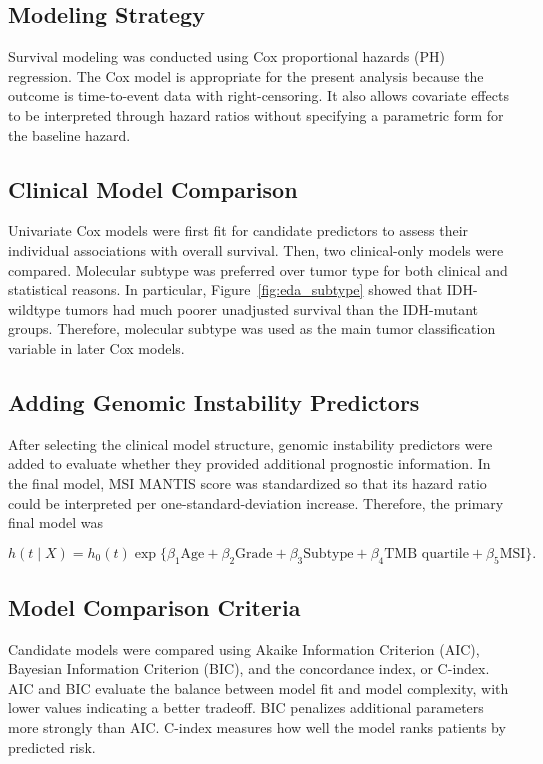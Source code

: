 \documentclass[paper=a4, fontsize=11pt]{scrartcl}
\numberwithin{equation}{section}		%
\numberwithin{figure}{section}			%
\numberwithin{table}{section}				%
\begin{document}
\subsection{Modeling Strategy}

Survival modeling was conducted using Cox proportional hazards (PH) regression. The Cox model is appropriate for the present analysis because the outcome is time-to-event data with right-censoring. It also allows covariate effects to be interpreted through hazard ratios without specifying a parametric form for the baseline hazard. 

\subsection{Clinical Model Comparison}

Univariate Cox models were first fit for candidate predictors to assess their individual associations with overall survival. Then, two clinical-only models were compared. Molecular subtype was preferred over tumor type for both clinical and statistical reasons. In particular, Figure~\ref{fig:eda_subtype} showed that IDH-wildtype tumors had much poorer unadjusted survival than the IDH-mutant groups. Therefore, molecular subtype was used as the main tumor classification variable in later Cox models. 

\subsection{Adding Genomic Instability Predictors} 

After selecting the clinical model structure, genomic instability predictors were added to evaluate whether they provided additional prognostic information. In the final model, MSI MANTIS score was standardized so that its hazard ratio could be interpreted per one-standard-deviation increase. Therefore, the primary final model was 

$$
h(t \mid X) = h_0(t)\exp\{ \beta_1\text{Age} + \beta_2\text{Grade} + \beta_3\text{Subtype} + \beta_4\text{TMB quartile} + \beta_5\text{MSI}\}. 
$$

\subsection{Model Comparison Criteria} 

Candidate models were compared using Akaike Information Criterion (AIC), Bayesian Information Criterion (BIC), and the concordance index, or C-index. AIC and BIC evaluate the balance between model fit and model complexity, with lower values indicating a better tradeoff. BIC penalizes additional parameters more strongly than AIC. C-index measures how well the model ranks patients by predicted risk. 
\end{document}
